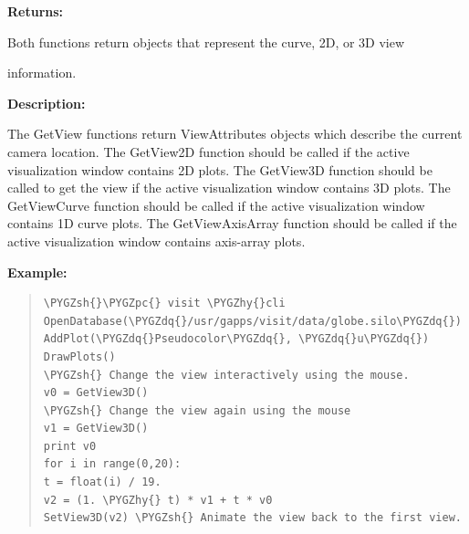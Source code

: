 \documentclass[letterpaper,10pt,english]{sphinxmanual}
\def\PYGZsh{\char`\#}
\def\PYGZpc{\char`\%}
\def\PYGZhy{\char`\-}
\def\PYGZdq{\char`\"}
\begin{document}
\begin{DUlineblock}{0em}
\item[] 
\item[] \textbf{Returns:}
\item[] Both functions return objects that represent the curve, 2D, or 3D view
\item[] information.
\item[] 
\item[] \textbf{Description:}
\item[] The GetView functions return ViewAttributes objects which describe the
current camera location. The GetView2D function should be called if the
active visualization window contains 2D plots. The GetView3D function
should be called to get the view if the active visualization window
contains 3D plots. The GetViewCurve function should be called if the active
visualization window contains 1D curve plots.  The GetViewAxisArray
function should be called if the active visualization window contains
axis-array plots.
\end{DUlineblock}

\begin{DUlineblock}{0em}
\item[] 
\end{DUlineblock}

\begin{DUlineblock}{0em}
\item[] \textbf{Example:}
\item[] 
\end{DUlineblock}
\begin{quote}

\begin{Verbatim}[commandchars=\\\{\}]
\PYGZsh{}\PYGZpc{} visit \PYGZhy{}cli
OpenDatabase(\PYGZdq{}/usr/gapps/visit/data/globe.silo\PYGZdq{})
AddPlot(\PYGZdq{}Pseudocolor\PYGZdq{}, \PYGZdq{}u\PYGZdq{})
DrawPlots()
\PYGZsh{} Change the view interactively using the mouse.
v0 = GetView3D()
\PYGZsh{} Change the view again using the mouse
v1 = GetView3D()
print v0
for i in range(0,20):
t = float(i) / 19.
v2 = (1. \PYGZhy{} t) * v1 + t * v0
SetView3D(v2) \PYGZsh{} Animate the view back to the first view.
\end{Verbatim}
\end{quote}
\end{document}
